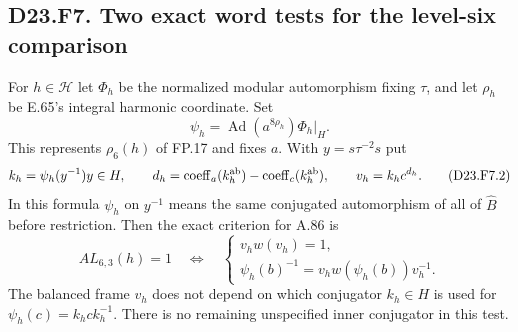 \subsection*{D23.F7. Two exact word tests for the level-six comparison}
For $h\in\mathcal H$ let $\Phi_h$ be the normalized modular
automorphism fixing $\tau$, and let $\rho_h$ be E.65's
integral harmonic coordinate.  Set
\[
 \psi_h=\operatorname{Ad}(a^{8\rho_h})\Phi_h\big|_H.
 \tag{D23.F7.1}
\]
This represents $\rho_6(h)$ of FP.17 and fixes $a$.
With $y=s\tau^{-2}s$ put
\[
 k_h=\psi_h(y^{-1})y\in H,\qquad
 d_h=\operatorname{coeff}_a(k_h^{\rm ab})-
                     \operatorname{coeff}_c(k_h^{\rm ab}),
 \qquad v_h=k_hc^{d_h}.
 \tag{D23.F7.2}
\]
In this formula $\psi_h$ on $y^{-1}$ means the same conjugated
automorphism of all of $\widehat B$ before restriction.
Then the exact criterion for A.86 is
\[
 AL_{6,3}(h)=1\quad\Longleftrightarrow\quad
 \begin{cases}
 v_h w(v_h)=1,\\
 \psi_h(b)^{-1}=v_h w(\psi_h(b))v_h^{-1}.
 \end{cases}
 \tag{D23.F7.3}
\]
The balanced frame $v_h$ does not depend on which conjugator
$k_h\in H$ is used for $\psi_h(c)=k_hck_h^{-1}$.
There is no remaining unspecified inner conjugator in this test.

